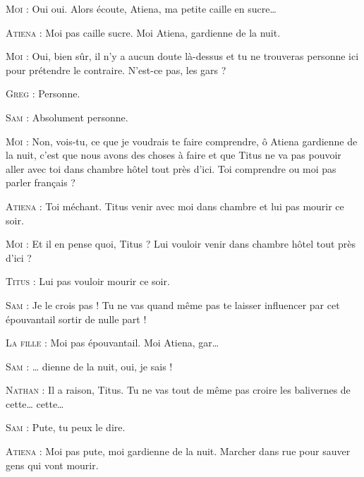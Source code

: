\begin{dialogue}
\textsc{Moi} : Oui oui. Alors écoute, Atiena, ma petite caille en sucre…

\textsc{Atiena} : Moi pas caille sucre. Moi Atiena, gardienne de la nuit.

\textsc{Moi} : Oui, bien sûr, il n’y a aucun doute là-dessus et tu ne trouveras personne ici pour prétendre le contraire. N’est-ce pas, les gars ?

\textsc{Greg} : Personne.

\textsc{Sam} : Absolument personne.

\textsc{Moi} : Non, vois-tu, ce que je voudrais te faire comprendre, ô Atiena gardienne de la nuit, c’est que nous avons des choses à faire et que Titus ne va pas pouvoir aller avec toi dans chambre hôtel tout près d’ici. Toi comprendre ou moi pas parler français ?

\textsc{Atiena} : Toi méchant. Titus venir avec moi dans chambre et lui pas mourir ce soir.

\textsc{Moi} : Et il en pense quoi, Titus ? Lui vouloir venir dans chambre hôtel tout près d’ici ?

\textsc{Titus} : Lui pas vouloir mourir ce soir.

\textsc{Sam} : Je le crois pas ! Tu ne vas quand même pas te laisser influencer par cet épouvantail sortir de nulle part !

\textsc{La fille} : Moi pas épouvantail. Moi Atiena, gar…

\textsc{Sam} : … dienne de la nuit, oui, je sais !

\textsc{Nathan} : Il a raison, Titus. Tu ne vas tout de même pas croire les balivernes de cette… cette…

\textsc{Sam} : Pute, tu peux le dire.

\textsc{Atiena} : Moi pas pute, moi gardienne de la nuit. Marcher dans rue pour sauver gens qui vont mourir.

\end{dialogue}

\vfill
{}

\scene

